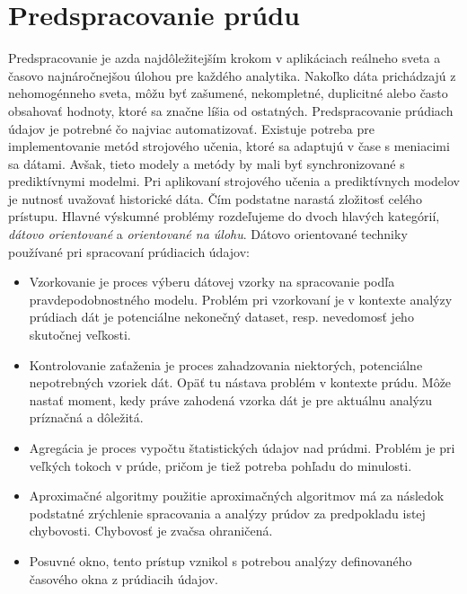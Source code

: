 \section{Predspracovanie prúdu}
Predspracovanie je azda najdôležitejším krokom v aplikáciach reálneho sveta a časovo najnáročnejšou úlohou pre každého analytika. Nakoľko dáta prichádzajú z nehomogénneho sveta, môžu byť zašumené, nekompletné, duplicitné alebo často obsahovať hodnoty, ktoré sa značne líšia od ostatných. Predspracovanie prúdiach údajov je potrebné čo najviac automatizovať. Existuje potreba pre implementovanie metód  strojového učenia, ktoré sa adaptujú v čase s meniacimi sa dátami. Avšak, tieto modely a metódy by mali byť synchronizované s prediktívnymi modelmi. Pri aplikovaní strojového učenia a prediktívnych modelov je nutnosť uvažovať historické dáta. Čím podstatne narastá zložitosť celého prístupu. Hlavné výskumné problémy rozdeľujeme do dvoch hlavých kategórií, \textit{dátovo orientované} a \textit{orientované na úlohu}. Dátovo orientované techniky používané pri spracovaní prúdiacich údajov: \newline
\begin{itemize}
	\item Vzorkovanie je proces výberu dátovej vzorky na spracovanie podľa pravdepodobnostného modelu. Problém pri vzorkovaní je v kontexte analýzy prúdiach dát je potenciálne nekonečný dataset, resp. nevedomosť jeho skutočnej veľkosti.
	\item Kontrolovanie zaťaženia je proces zahadzovania niektorých, potenciálne nepotrebných vzoriek dát. Opäť tu nástava problém v kontexte prúdu. Môže nastať moment, kedy práve zahodená vzorka dát je pre aktuálnu analýzu príznačná a dôležitá.
	\item Agregácia je proces vypočtu štatistických údajov nad prúdmi. Problém je pri veľkých tokoch v prúde, pričom je tiež potreba pohľadu do minulosti.
\end{itemize}
\begin{itemize}
	\item Aproximačné algoritmy použitie aproximačných algoritmov má za následok podstatné zrýchlenie spracovania a analýzy prúdov za predpokladu istej chybovosti. Chybovosť je zvačsa ohraničená.
	\item Posuvné okno, tento prístup vznikol s potrebou analýzy definovaného časového okna z prúdiacih údajov.
\end{itemize}

